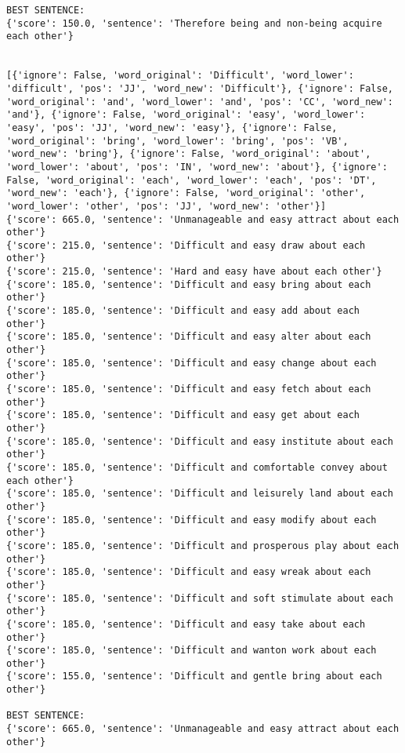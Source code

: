 \documentclass[12pt,a4paper,oneside]{book}
\begin{document}
\begin{verbatim}
BEST SENTENCE:
{'score': 150.0, 'sentence': 'Therefore being and non-being acquire each other'}


[{'ignore': False, 'word_original': 'Difficult', 'word_lower': 'difficult', 'pos': 'JJ', 'word_new': 'Difficult'}, {'ignore': False, 'word_original': 'and', 'word_lower': 'and', 'pos': 'CC', 'word_new': 'and'}, {'ignore': False, 'word_original': 'easy', 'word_lower': 'easy', 'pos': 'JJ', 'word_new': 'easy'}, {'ignore': False, 'word_original': 'bring', 'word_lower': 'bring', 'pos': 'VB', 'word_new': 'bring'}, {'ignore': False, 'word_original': 'about', 'word_lower': 'about', 'pos': 'IN', 'word_new': 'about'}, {'ignore': False, 'word_original': 'each', 'word_lower': 'each', 'pos': 'DT', 'word_new': 'each'}, {'ignore': False, 'word_original': 'other', 'word_lower': 'other', 'pos': 'JJ', 'word_new': 'other'}]
{'score': 665.0, 'sentence': 'Unmanageable and easy attract about each other'}
{'score': 215.0, 'sentence': 'Difficult and easy draw about each other'}
{'score': 215.0, 'sentence': 'Hard and easy have about each other'}
{'score': 185.0, 'sentence': 'Difficult and easy bring about each other'}
{'score': 185.0, 'sentence': 'Difficult and easy add about each other'}
{'score': 185.0, 'sentence': 'Difficult and easy alter about each other'}
{'score': 185.0, 'sentence': 'Difficult and easy change about each other'}
{'score': 185.0, 'sentence': 'Difficult and easy fetch about each other'}
{'score': 185.0, 'sentence': 'Difficult and easy get about each other'}
{'score': 185.0, 'sentence': 'Difficult and easy institute about each other'}
{'score': 185.0, 'sentence': 'Difficult and comfortable convey about each other'}
{'score': 185.0, 'sentence': 'Difficult and leisurely land about each other'}
{'score': 185.0, 'sentence': 'Difficult and easy modify about each other'}
{'score': 185.0, 'sentence': 'Difficult and prosperous play about each other'}
{'score': 185.0, 'sentence': 'Difficult and easy wreak about each other'}
{'score': 185.0, 'sentence': 'Difficult and soft stimulate about each other'}
{'score': 185.0, 'sentence': 'Difficult and easy take about each other'}
{'score': 185.0, 'sentence': 'Difficult and wanton work about each other'}
{'score': 155.0, 'sentence': 'Difficult and gentle bring about each other'}

BEST SENTENCE:
{'score': 665.0, 'sentence': 'Unmanageable and easy attract about each other'}



\end{verbatim}
\end{document}
